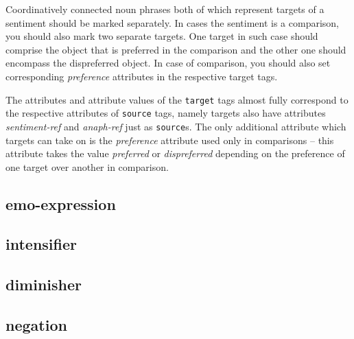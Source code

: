 \documentclass[11pt,a4paper]{article}
\begin{document}
Coordinatively connected noun phrases both of which represent targets
of a sentiment should be marked separately.  In cases the sentiment is
a comparison, you should also mark two separate targets.  One target
in such case should comprise the object that is preferred in the
comparison and the other one should encompass the dispreferred
object. In case of comparison, you should also set corresponding
\textit{preference} attributes in the respective target tags.

The attributes and attribute values of the \texttt{target} tags almost
fully correspond to the respective attributes of \texttt{source} tags,
namely targets also have attributes \textit{sentiment-ref} and
\textit{anaph-ref} just as \texttt{source}s.  The only additional
attribute which targets can take on is the \textit{preference}
attribute used only in comparisons -- this attribute takes the value
\textit{preferred} or \textit{dispreferred} depending on the
preference of one target over another in comparison.

\subsection{emo-expression}
\subsection{intensifier}
\subsection{diminisher}
\subsection{negation}




\end{document}
